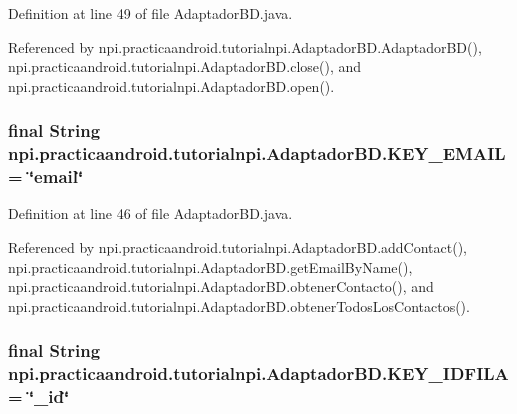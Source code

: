 Definition at line 49 of file Adaptador\-B\-D.\-java.



Referenced by npi.\-practicaandroid.\-tutorialnpi.\-Adaptador\-B\-D.\-Adaptador\-B\-D(), npi.\-practicaandroid.\-tutorialnpi.\-Adaptador\-B\-D.\-close(), and npi.\-practicaandroid.\-tutorialnpi.\-Adaptador\-B\-D.\-open().

\hypertarget{classnpi_1_1practicaandroid_1_1tutorialnpi_1_1_adaptador_b_d_a73ed6dbe79a9f13e4d84a081e10a3d3f}{
\subsubsection[{K\-E\-Y\-\_\-\-E\-M\-A\-I\-L}]{\setlength{\rightskip}{0pt plus 5cm}final String npi.\-practicaandroid.\-tutorialnpi.\-Adaptador\-B\-D.\-K\-E\-Y\-\_\-\-E\-M\-A\-I\-L = \char`\"{}email\char`\"{}\hspace{0.3cm}{\ttfamily [static]}}}\label{classnpi_1_1practicaandroid_1_1tutorialnpi_1_1_adaptador_b_d_a73ed6dbe79a9f13e4d84a081e10a3d3f}


Definition at line 46 of file Adaptador\-B\-D.\-java.



Referenced by npi.\-practicaandroid.\-tutorialnpi.\-Adaptador\-B\-D.\-add\-Contact(), npi.\-practicaandroid.\-tutorialnpi.\-Adaptador\-B\-D.\-get\-Email\-By\-Name(), npi.\-practicaandroid.\-tutorialnpi.\-Adaptador\-B\-D.\-obtener\-Contacto(), and npi.\-practicaandroid.\-tutorialnpi.\-Adaptador\-B\-D.\-obtener\-Todos\-Los\-Contactos().

\hypertarget{classnpi_1_1practicaandroid_1_1tutorialnpi_1_1_adaptador_b_d_aef0b2454f8965f292b6c5e1c3f3de2b1}{
\subsubsection[{K\-E\-Y\-\_\-\-I\-D\-F\-I\-L\-A}]{\setlength{\rightskip}{0pt plus 5cm}final String npi.\-practicaandroid.\-tutorialnpi.\-Adaptador\-B\-D.\-K\-E\-Y\-\_\-\-I\-D\-F\-I\-L\-A = \char`\"{}\-\_\-id\char`\"{}\hspace{0.3cm}{\ttfamily [static]}}}\label{classnpi_1_1practicaandroid_1_1tutorialnpi_1_1_adaptador_b_d_aef0b2454f8965f292b6c5e1c3f3de2b1}


